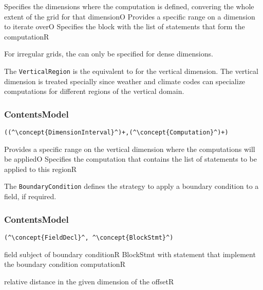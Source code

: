\begin{HIRChildElements}
	{Specifies the dimensions where the computation is defined,
		convering the whole extent of the grid for that dimension}{O}
	{Provides a specific range on a dimension to iterate over}{O}
	{Specifies the block with the list of statements that form the computation}{R}
\end{HIRChildElements}


For irregular grids, the  can only 
be specified for dense dimensions.

The {\tt VerticalRegion} is the equivalent to 
for the vertical dimension.
The vertical dimension is treated specially since weather and 
climate codes can specialize computations for different regions
of the vertical domain.

\subsubsection*{ContentsModel}{}

\begin{lstlisting}[style=default,frame=none]
((^\concept{DimensionInterval}^)+,(^\concept{Computation}^)+)
\end{lstlisting}

\begin{HIRChildElements}
	{Provides a specific range on the vertical dimension where
		the computations will be applied}{O}
	{Specifies the computation that contains the list of statements to be applied to this region}{R}
\end{HIRChildElements}


The {\tt BoundaryCondition} defines the strategy to apply a boundary condition to a field, if required.

\subsubsection*{ContentsModel}{}

\begin{lstlisting}[style=default,frame=none]
(^\concept{FieldDecl}^, ^\concept{BlockStmt}^)
\end{lstlisting}

\begin{HIRChildElements}
	{field subject of boundary condition}{R}
	{BlockStmt with statement that implement the boundary condition computation}{R}
\end{HIRChildElements}

\begin{HIRAttributes}
	{relative distance in the given dimension of the offset}{R}
\end{HIRAttributes}
